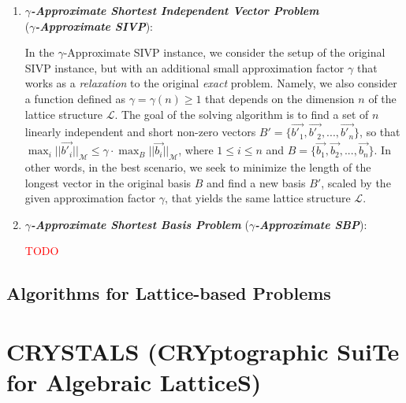 \documentclass[runningheads]{llncs}
\numberwithin{equation}{section}
\begin{document}
\begin{enumerate}
        \item \textbf{\textit{$\gamma$-Approximate Shortest Independent Vector Problem}}\\(\textbf{\textit{$\gamma$-Approximate SIVP}}):
        \vspace{0.6ex}
        
        In the $\gamma$-Approximate SIVP instance, we consider the setup of the original SIVP instance, but with an additional small approximation factor $\gamma$ that works as a \textit{relaxation} to the original \textit{exact} problem. Namely, we also consider a function defined as $\gamma = \gamma(n) \geq 1$ that depends on the dimension $n$ of the lattice structure $\mathcal{L}$. The goal of the solving algorithm is to find a set of $n$ linearly independent and short non-zero vectors $B' = \{ \Vec{{b'}_{1}}, \Vec{{b'}_{2}}, ..., \Vec{{b'}_{n}} \}$, so that ${\max}_{i} {||\Vec{{b'}_{i}}||}_{\mathcal{M}} \leq \gamma \cdot {\max}_{B} {||\Vec{{b}_{i}}||}_{\mathcal{M}}$, where $1 \leq i \leq n$ and $B = \{ \Vec{{b}_{1}}, \Vec{{b}_{2}}, ..., \Vec{{b}_{n}} \}$. In other words, in the best scenario, we seek to minimize the length of the longest vector in the original basis $B$ and find a new basis $B'$, scaled by the given approximation factor $\gamma$, that yields the same lattice structure $\mathcal{L}$.
        \vspace{2ex}
        
        \item \textbf{\textit{$\gamma$-Approximate Shortest Basis Problem}} (\textbf{\textit{$\gamma$-Approximate SBP}}):
        \vspace{0.6ex}

        \textcolor{red}{TODO}
        \vspace{2ex}
        
        
        
    \end{enumerate}
    
    \subsection{Algorithms for Lattice-based Problems}
    \label{subsec:algorithms-for-lattice-based-problems}
    
    \newpage
    
    


        \section{CRYSTALS (CRYptographic SuiTe for Algebraic LatticeS)}
    \label{sec:crystals-cryptographic-suite-for-algebraic-lattices}
\end{document}
